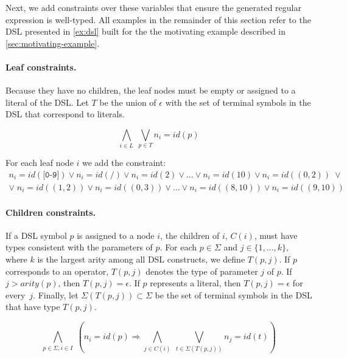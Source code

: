 Next, we add constraints over these variables that ensure the generated regular expression is well-typed. 
All examples in the remainder of this section refer to the DSL presented in \autoref{ex:dsl} built for the
the motivating example described in \autoref{sec:motivating-example}.

\paragraph{Leaf constraints.} 
Because they have no children, the leaf nodes must be empty or assigned to a literal of the DSL.
Let \(T\) be the union of \(\epsilon\) with the set of terminal symbols in the DSL that correspond to literals.

\begin{equation}
    \bigwedge_{i \in L} \; \bigvee_{p \in T} n_i = id(p)
\end{equation}

\begin{example}\label{ex:leaf-constraints}
For each leaf node \(i\) we add the constraint:
\begin{gather*}
    n_i = id(\texttt{[0-9]}) \lor n_i = id(\texttt{/}) \lor n_i = id(2) \lor ... \lor n_i = id(10) \lor n_i = id((0,2)) \;\lor \\
    \lor\; n_i = id((1,2)) \lor  n_i = id((0,3)) \lor ... \lor  n_i = id((8,10))\lor  n_i = id((9,10)) 
\end{gather*}
\end{example}


\paragraph{Children constraints.}
If a DSL symbol \(p\) is assigned to a node \(i\), the children of \(i\), \(C(i)\), must have types consistent with the parameters of \(p\).
For each \(p \in \Sigma\) and \(j \in \{1, ..., k\}\), where \(k\) is the largest arity among all DSL constructs, we define \(T(p, j)\).
If \(p\) corresponds to an operator, \(T(p, j)\) denotes the type of parameter \(j\) of \(p\). If \({j > arity(p)}\), then \(T(p,j) = \epsilon\).
If \(p\) represents a literal, then \(T(p,j) = \epsilon\) for every~\(j\).
Finally, let \(\Sigma(T(p,j)) \subset \Sigma\) be the set of terminal symbols in the \ac{DSL} that have type \(T(p,j)\).

\begin{equation}
    \bigwedge_{p \in \Sigma, i \in I}\; \left(n_i = id(p) \Rightarrow \bigwedge_{j \in C(i)} \; \bigvee_{t \in \Sigma(T(p,j))} n_j = id(t) \right)
\end{equation}

